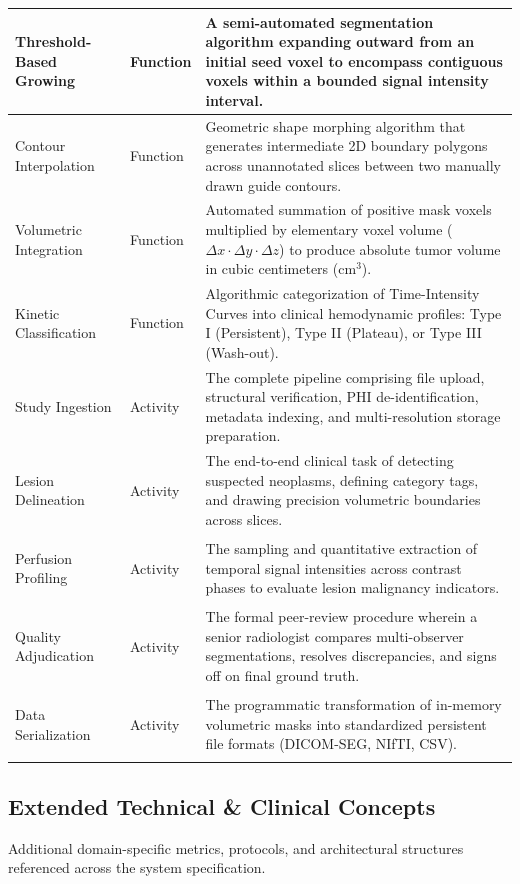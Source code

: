 \documentclass[11pt, a4paper]{article}
\begin{document}
\begin{tabularx}{\textwidth}{|>{\bfseries\raggedright\arraybackslash}p{3.6cm}|>{\raggedright\arraybackslash}p{2.9cm}|X|}
    \hline
    Threshold-Based Growing & Function & A semi-automated segmentation algorithm expanding outward from an initial seed voxel to encompass contiguous voxels within a bounded signal intensity interval. \\
    \hline
    Contour Interpolation & Function & Geometric shape morphing algorithm that generates intermediate 2D boundary polygons across unannotated slices between two manually drawn guide contours. \\
    \hline
    Volumetric Integration & Function & Automated summation of positive mask voxels multiplied by elementary voxel volume ($\Delta x \cdot \Delta y \cdot \Delta z$) to produce absolute tumor volume in cubic centimeters ($\text{cm}^3$). \\
    \hline
    Kinetic Classification & Function & Algorithmic categorization of Time-Intensity Curves into clinical hemodynamic profiles: Type I (Persistent), Type II (Plateau), or Type III (Wash-out). \\
    \hline
    Study Ingestion & Activity & The complete pipeline comprising file upload, structural verification, PHI de-identification, metadata indexing, and multi-resolution storage preparation. \\
    \hline
    Lesion Delineation & Activity & The end-to-end clinical task of detecting suspected neoplasms, defining category tags, and drawing precision volumetric boundaries across slices. \\
    \hline
    Perfusion Profiling & Activity & The sampling and quantitative extraction of temporal signal intensities across contrast phases to evaluate lesion malignancy indicators. \\
    \hline
    Quality Adjudication & Activity & The formal peer-review procedure wherein a senior radiologist compares multi-observer segmentations, resolves discrepancies, and signs off on final ground truth. \\
    \hline
    Data Serialization & Activity & The programmatic transformation of in-memory volumetric masks into standardized persistent file formats (DICOM-SEG, NIfTI, CSV). \\
\end{tabularx}

\subsection{Extended Technical \& Clinical Concepts}

Additional domain-specific metrics, protocols, and architectural structures referenced across the system specification.
\end{document}
